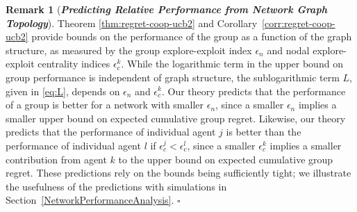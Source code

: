 \documentclass[final,5p,times,twocolumn]{elsarticle}
\theoremstyle{definition}
\newtheorem{remark}{Remark}
\newcommand\oprocendsymbol{\hbox{$\square$}}
\newcommand\oprocend{\relax\ifmmode\else\unskip\hfill\fi\oprocendsymbol}
\newcommand\bit[1]{\textit{\textbf{#1}}}
\begin{document}
\begin{remark}[\bit{{Predicting Relative Performance from Network Graph Topology}}] \label{Remark:Indiv}
	Theorem \ref{thm:regret-coop-ucb2} and Corollary~\ref{corr:regret-coop-ucb2} provide bounds on the performance of the group as a function of the graph structure, {as measured by the group explore-exploit index $\epsilon_n$ and nodal explore-exploit centrality indices $\epsilon_c^k$. While the logarithmic term in the upper bound on group performance is independent of graph structure, the sublogarithmic term $L$, given in \eqref{eq:L}, depends on $\epsilon_n$ and $\epsilon_c^k$. Our theory predicts that the performance of a group is better for a network with smaller $\epsilon_n$, since a smaller $\epsilon_n$ implies a smaller upper bound on expected cumulative group regret.  Likewise, our theory predicts that the performance of individual agent $j$ is better than the performance of individual agent $l$ if $\epsilon_c^j < \epsilon_c^l$, since a smaller $\epsilon_c^k$ implies a smaller contribution from agent $k$ to the upper bound on expected cumulative group regret. These predictions rely on the bounds being sufficiently tight; we illustrate the usefulness of the predictions with simulations in Section~\ref{NetworkPerformanceAnalysis}}.
	\oprocend
\end{remark}
\end{document}
